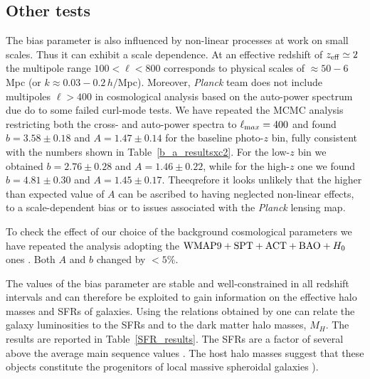 \subsection{Other tests}
The bias parameter is also influenced by non-linear processes at work on small scales. Thus it can exhibit a scale dependence. At an effective redshift of $z_{\rm{eff}}\simeq 2$ the multipole range $100 < \ell < 800$ corresponds to physical scales of $\approx 50 - 6$ Mpc (or $k \approx 0.03-0.2\, h/$Mpc). Moreover, \emph{Planck} team does not include multipoles $\ell>400$ in cosmological analysis based on the auto-power spectrum due do to some failed curl-mode tests. We have repeated the MCMC analysis restricting both the cross- and auto-power spectra to $\ell_{\rm max} = 400$ and found $b=3.58\pm0.18$ and $A = 1.47\pm0.14$ for the baseline photo-$z$ bin, fully consistent with the numbers shown in Table~\eqref{b_a_resultsxc2}. For the low-$z$ bin we obtained  $b=2.76\pm0.28$ and $A = 1.46\pm0.22$, while for the high-$z$ one we found $b=4.81\pm0.30$ and $A = 1.45\pm0.17$. Theeqrefore it looks unlikely that the higher than expected value of $A$ can be 
ascribed to having neglected non-linear effects, to a scale-dependent bias or to issues associated with the \emph{Planck} lensing map.

To check the effect of our choice of the background cosmological parameters we have repeated the analysis adopting the $\hbox{WMAP}9 + \hbox{SPT} + \hbox{ACT} + \hbox{BAO} + H_0$ ones \citep{Hinshaw2013}. Both $A$ and $b$ changed by $<5\%$.

The values of the bias parameter are stable and well-constrained in all redshift intervals and can therefore be exploited to gain information on the effective halo masses and SFRs of galaxies. Using the relations obtained by \cite{Aversa2015} one can relate the galaxy luminosities to the SFRs and to the dark matter halo masses, $M_H$. The results are reported in Table~\eqref{SFR_results}. The SFRs are a factor of several above the average main sequence values \citep[see][]{Rodighiero2014,Speagle2014}. The host halo masses suggest that these objects constitute the progenitors of local massive spheroidal galaxies  \citep[see][]{Lapi2011,Lapi2014a}).

